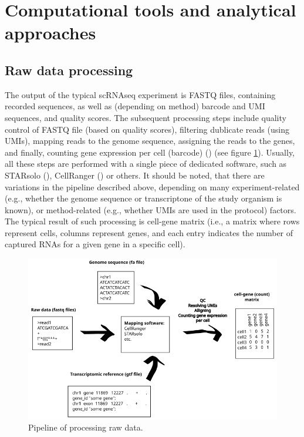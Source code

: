 \section{Computational tools and analytical approaches}

\subsection{Raw data processing}

The output of the typical scRNAseq experiment is FASTQ files, containing recorded sequences,
as well as (depending on method) barcode and UMI sequences, and quality scores.
The subsequent processing steps include quality control of FASTQ file (based on quality scores),
filtering dublicate reads (using UMIs), mapping reads to the genome sequence, assigning the reads to the genes,
and finally, counting gene expression per cell (barcode) (\cite{Heumos2023}) (see figure \ref{fig:rawData}).
Usually, all these steps are performed with a single piece of dedicated software,
such as STARsolo (\cite{Kaminow2021}), CellRanger (\cite{Zheng2017}) or others.
It should be noted, that there are variations in the pipeline described above,
depending on many experiment-related (e.g., whether the genome sequence or transcriptone of the study organism is known),
or method-related (e.g., whether UMIs are used in the protocol) factors.
The typical result of such processing is cell-gene matrix (i.e., a matrix where rows represent cells,
columns represent genes, and each entry indicates the number of captured RNAs for a given gene in a specific cell).

\begin{figure}
  \centering
  \includegraphics[width=\linewidth]{images/rawdata.png}
  \caption{Pipeline of processing raw data.}
  \label{fig:rawData}
\end{figure}

